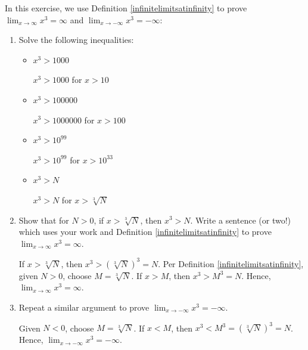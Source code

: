 \documentclass{ximera}
\begin{document}
\begin{problem} 
In this exercise, we use Definition \ref{infinitelimitsatinfinity} to prove $\lim_{x \rightarrow \infty} x^3 = \infty$ and $\lim_{x \rightarrow -\infty} x^3 = -\infty$:


\begin{enumerate}

\item  Solve the following inequalities:



\begin{itemize}

\item  $x^3 > 1000$

\begin{solution}
$x^3 > 1000$ for $x > 10$
\end{solution}

\item  $x^3 > 100000$

\begin{solution}
$x^3 > 1000000$ for $x > 100$
\end{solution}

\item  $x^3 > 10^{99}$

\begin{solution}
$x^3 > 10^{99}$ for $x > 10^{33}$
\end{solution}


\item  $x^3 > N$

\begin{solution}
 $x^3 > N$ for $x > \sqrt[3]{N}$
\end{solution}

\end{itemize}

\item  Show that for $N > 0$, if $x > \sqrt[3]{N}$, then $x^3 > N$.  Write a sentence (or two!) which uses your work and Definition \ref{infinitelimitsatinfinity} to prove $\lim_{x \rightarrow \infty} x^3 = \infty$.

\begin{solution}
If $x > \sqrt[3]{N}$, then $x^3 > \left(\sqrt[3]{N} \right)^3 = N$.  Per  Definition \ref{infinitelimitsatinfinity}, given $N>0$, choose $M = \sqrt[3]{N}$.  If $x > M$, then $x^3 > M^3 = N$. Hence,  $\lim_{x \rightarrow \infty} x^3 = \infty$.
\end{solution}

\item  Repeat a similar argument to prove $\lim_{x \rightarrow -\infty} x^3 = -\infty$.

\begin{solution}
Given $N<0$, choose $M = \sqrt[3]{N}$.  If $x< M$, then $x^3 < M^3 = \left(\sqrt[3]{N}\right)^3 = N$.  Hence,   $\lim_{x \rightarrow -\infty} x^3 = -\infty$.
\end{solution}
\end{enumerate}
 
\end{problem}
\end{document}
